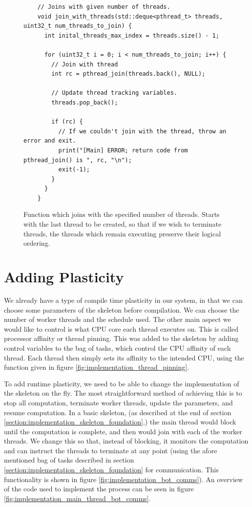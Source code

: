 \begin{figure}
	\begin{lstlisting}
	// Joins with given number of threads. 
	void join_with_threads(std::deque<pthread_t> threads, uint32_t num_threads_to_join) {
	  int inital_threads_max_index = threads.size() - 1;

	  for (uint32_t i = 0; i < num_threads_to_join; i++) {
	    // Join with thread
	    int rc = pthread_join(threads.back(), NULL);

	    // Update thread tracking variables.
	    threads.pop_back();

	    if (rc) {
	      // If we couldn't join with the thread, throw an error and exit.
	      print("[Main] ERROR; return code from pthread_join() is ", rc, "\n");
	      exit(-1);
	    }
	  }
	}
	\end{lstlisting}

	\caption{Function which joins with the specified number of threads. Starts with the last thread to be created, so that if we wish to terminate threads, the threads which remain executing preserve their logical ordering.}
	\label{fig:implementation_join_threads}
\end{figure}



\section{Adding Plasticity}
\label{section:implementation_adding_plasticity}

We already have a type of compile time plasticity in our system, in that we can choose some parameters of the skeleton before compilation. We can choose the number of worker threads and the schedule used. The other main aspect we would like to control is what CPU core each thread executes on. This is called processor affinity or thread pinning. This was added to the skeleton by adding control variables to the bag of tasks, which control the CPU affinity of each thread. Each thread then simply sets its affinity to the intended CPU, using the function given in figure \ref{fig:implementation_thread_pinning}.

To add runtime plasticity, we need to be able to change the implementation of the skeleton on the fly. The most straightforward method of achieving this is to stop all computation, terminate worker threads, update the parameters, and resume computation. In a basic skeleton, (as described at the end of section \ref{section:implementation_skeleton_foundation},) the main thread would block until the computation is complete, and then would join with each of the worker threads. We change this so that, instead of blocking, it monitors the computation and can instruct the threads to terminate at any point (using the afore mentioned bag of tasks described in section \ref{section:implementation_skeleton_foundation} for communication. This functionality is shown in figure \ref{fig:implementation_bot_comms}). An overview of the code used to implement the process can be seen in figure \ref{fig:implementation_main_thread_bot_comms}.


